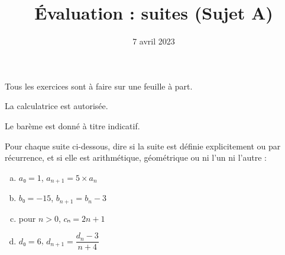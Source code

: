 \documentclass[
	classe=$1^{ere}STI2D$
]{évaluation}
\date{7 avril 2023}
\begin{document}
\title{Évaluation : suites (Sujet A)}
\maketitle

\begin{tcolorbox}
	Tous les exercices sont à faire sur une feuille à part.

	La calculatrice est autorisée.

	Le barème est donné à titre indicatif.
\end{tcolorbox}

\begin{exercice}[4]
	Pour chaque suite ci-dessous, dire si la suite est définie explicitement ou par récurrence, et si elle est arithmétique, géométrique ou ni l'un ni l'autre :
	\begin{multicols}{2}
		\begin{enumerate}[a)]
			\item $a₀ = 1$, $a_{n+1} = 5 × a_n$
			\item $b₀ = -15$, $b_{n+1} = b_n - 3$
			      \columnbreak
			\item pour $n > 0$, $cₙ = 2n + 1$
			\item $d₀ = 6$, $d_{n+1} = \dfrac{d_n - 3}{n + 4}$
		\end{enumerate}
	\end{multicols}
\end{exercice}
\end{document}
